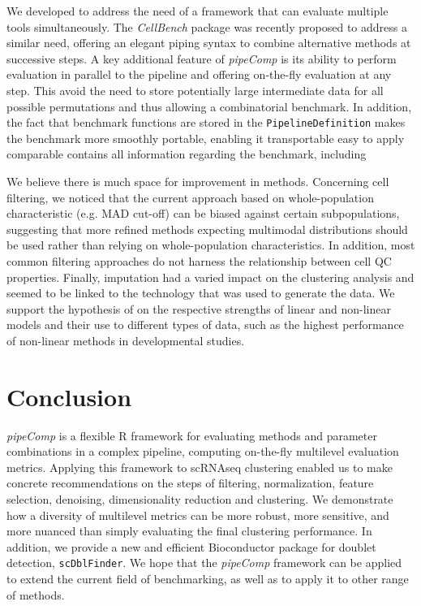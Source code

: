 \documentclass{bmcart}
\begin{document}
We developed  to address the need of a framework that can evaluate multiple tools simultaneously. The \textit{CellBench} package was recently proposed to address a similar need\citep{su_cellbench}, offering an elegant piping syntax to combine alternative methods at successive steps. A key additional feature of \textit{pipeComp} is its ability to perform evaluation in parallel to the pipeline and offering on-the-fly evaluation at any step. This avoid the need to store potentially large intermediate data for all possible permutations and thus allowing a combinatorial benchmark. In addition, the fact that benchmark functions are stored in the \texttt{PipelineDefinition} makes the benchmark more smoothly portable, enabling it transportable easy to apply comparable contains all information regarding the benchmark, including 

We believe there is much space for improvement in methods. Concerning cell filtering, we noticed that the current approach based on whole-population characteristic (e.g. MAD cut-off) can be biased against certain subpopulations, suggesting that more refined methods expecting multimodal distributions should be used rather than relying on whole-population characteristics. In addition, most common filtering approaches do not harness the relationship between cell QC properties. Finally, imputation had a varied impact on the clustering analysis and seemed to be linked to the technology that was used to generate the data. We support the hypothesis of \citep{ZhangImput2018} on the respective strengths of linear and non-linear models and their use to different types of data, such as the highest performance of non-linear methods in developmental studies. 

\section*{Conclusion}

\textit{pipeComp} is a flexible R framework for evaluating methods and parameter combinations in a complex pipeline, computing on-the-fly multilevel evaluation metrics. Applying this framework to scRNAseq clustering enabled us to make concrete recommendations on the steps of filtering, normalization, feature selection, denoising, dimensionality reduction and clustering. We demonstrate how a diversity of multilevel metrics can be more robust, more sensitive, and more nuanced than simply evaluating the final clustering performance. In addition, we provide a new and efficient Bioconductor package for doublet detection, \texttt{scDblFinder}. We hope that the \textit{pipeComp} framework can be applied to extend the current field of benchmarking, as well as to apply it to other range of methods.
\end{document}
